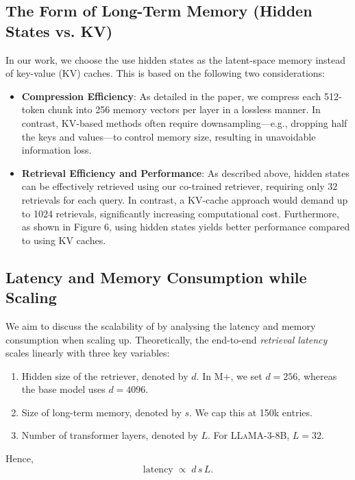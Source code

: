 \subsection{The Form of Long-Term Memory (Hidden States vs. KV)}
\label{sub:form_of_long_term_memory}
In our work, we choose the use hidden states as the latent-space memory instead of key-value (KV) caches. This is based on the following two considerations: 
\begin{itemize}
    \item \textbf{Compression Efficiency}: As detailed in the paper, we compress each 512-token chunk into 256 memory vectors per layer in a lossless manner. In contrast, KV-based methods often require downsampling—e.g., dropping half the keys and values—to control memory size, resulting in unavoidable information loss. 
    \item \textbf{Retrieval Efficiency and Performance}: As described above, hidden states can be effectively retrieved using our co-trained retriever, requiring only 32 retrievals for each query. In contrast, a KV-cache approach would demand up to 1024 retrievals, significantly increasing computational cost. Furthermore, as shown in Figure 6, using hidden states yields better performance compared to using KV caches.
\end{itemize}



\subsection{Latency and Memory Consumption while Scaling}
\label{sec:latency_and_memory_consumption_while_scaling}
We aim to discuss the scalability of \ours by analysing the latency and memory consumption when scaling up. 
Theoretically, the end-to-end \emph{retrieval latency} scales linearly with three key variables:

\begin{enumerate}[label=(\arabic*)]
    \item Hidden size of the retriever, denoted by $d$.  
          In \textsc{M+}, we set $d = 256$, whereas the base model uses $d = 4096$.
    \item Size of long-term memory, denoted by $s$.  
          We cap this at 150k entries.
    \item Number of transformer layers, denoted by $L$.  
          For \textsc{LLaMA-3-8B}, $L = 32$.
\end{enumerate}

Hence,
\[
\text{latency} \;\propto\; d \, s \, L.
\]

